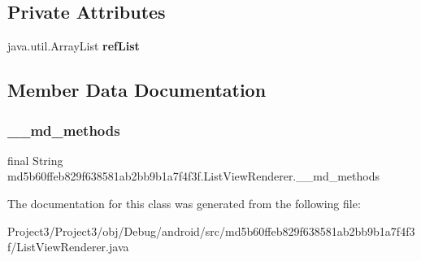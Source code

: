 \subsection*{Private Attributes}
\begin{DoxyCompactItemize}
\item 
\mbox{\label{classmd5b60ffeb829f638581ab2bb9b1a7f4f3f_1_1ListViewRenderer_a38328e716caa471f08bce0fc4af554aa}} 
java.\+util.\+Array\+List {\bfseries ref\+List}
\end{DoxyCompactItemize}


\subsection{Member Data Documentation}
\mbox{\label{classmd5b60ffeb829f638581ab2bb9b1a7f4f3f_1_1ListViewRenderer_ad5546d58609fec476ca441ccf586e954}} 
\subsubsection{\texorpdfstring{\+\_\+\+\_\+md\+\_\+methods}{\_\_md\_methods}}
{\footnotesize\ttfamily final String md5b60ffeb829f638581ab2bb9b1a7f4f3f.\+List\+View\+Renderer.\+\_\+\+\_\+md\+\_\+methods\hspace{0.3cm}{\ttfamily [static]}}



The documentation for this class was generated from the following file\+:\begin{DoxyCompactItemize}
\item 
Project3/\+Project3/obj/\+Debug/android/src/md5b60ffeb829f638581ab2bb9b1a7f4f3f/List\+View\+Renderer.\+java\end{DoxyCompactItemize}
